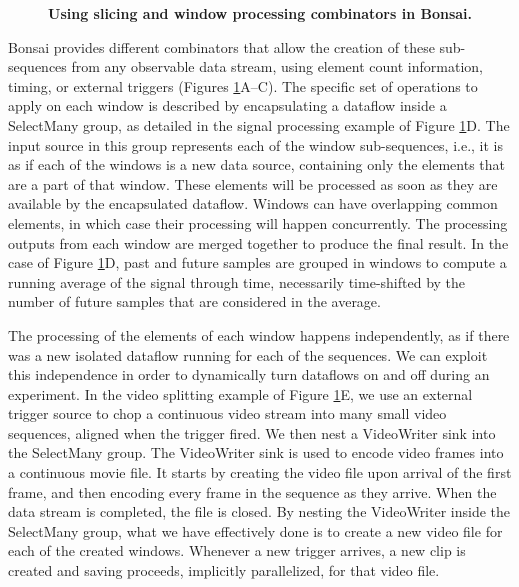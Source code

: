 \begin{figure}
\begin{center}
\scalebox{0.5}{}
\end{center}
\vspace{-5mm}
\caption{\textbf{Using slicing and window processing combinators in Bonsai.}}
\label{fig:bonsaiAdvanced}
\end{figure}

Bonsai provides different combinators that allow the creation of these sub-sequences from any observable data stream, using element count information, timing, or external triggers (Figures \ref{fig:bonsaiAdvanced}A–C). The specific set of operations to apply on each window is described by encapsulating a dataflow inside a SelectMany group, as detailed in the signal processing example of Figure \ref{fig:bonsaiAdvanced}D. The input source in this group represents each of the window sub-sequences, i.e., it is as if each of the windows is a new data source, containing only the elements that are a part of that window. These elements will be processed as soon as they are available by the encapsulated dataflow. Windows can have overlapping common elements, in which case their processing will happen concurrently. The processing outputs from each window are merged together to produce the final result. In the case of Figure \ref{fig:bonsaiAdvanced}D, past and future samples are grouped in windows to compute a running average of the signal through time, necessarily time-shifted by the number of future samples that are considered in the average.

The processing of the elements of each window happens independently, as if there was a new isolated dataflow running for each of the sequences. We can exploit this independence in order to dynamically turn dataflows on and off during an experiment. In the video splitting example of Figure \ref{fig:bonsaiAdvanced}E, we use an external trigger source to chop a continuous video stream into many small video sequences, aligned when the trigger fired. We then nest a VideoWriter sink into the SelectMany group. The VideoWriter sink is used to encode video frames into a continuous movie file. It starts by creating the video file upon arrival of the first frame, and then encoding every frame in the sequence as they arrive. When the data stream is completed, the file is closed. By nesting the VideoWriter inside the SelectMany group, what we have effectively done is to create a new video file for each of the created windows. Whenever a new trigger arrives, a new clip is created and saving proceeds, implicitly parallelized, for that video file.

